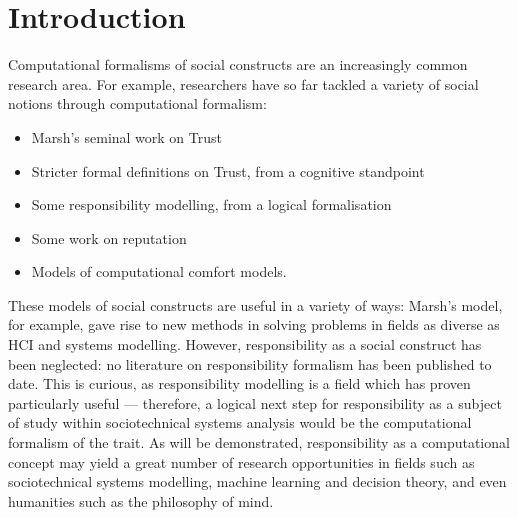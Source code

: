 \section{Introduction}\label{sec:intro}

Computational formalisms of social constructs are an increasingly common research area. For example, researchers have so far tackled a variety of social notions through computational formalism:

\begin{itemize}
    \item Marsh's seminal work on Trust\cite{Marsh1994FormalisingConcept}
    
    \item Stricter formal definitions on Trust, from a cognitive standpoint\cite{CastelfranchiSocialApproach}
    
    \item Some responsibility modelling, from a logical formalisation\cite{Simpson2015FormalisingAnalysis}
    
    \item Some work on reputation~\cite{Chandrasekaran2011ASystems}

    \item Models of computational comfort models\cite{Marsh2011}.
    
\end{itemize}

These models of social constructs are useful in a variety of ways: Marsh's model, for example, gave rise to new methods in solving problems in fields as diverse as HCI\cite{designing_with_trust} and systems modelling\cite{Huynh2006}. However, responsibility as a social construct has been neglected: no literature on responsibility formalism has been published to date. This is curious, as responsibility modelling is a field which has proven particularly useful --- therefore, a logical next step for responsibility as a subject of study within sociotechnical systems analysis would be the computational formalism of the trait. As will be demonstrated, responsibility as a computational concept may yield a great number of research opportunities in fields such as sociotechnical systems modelling, machine learning and decision theory, and even humanities such as the philosophy of mind.


